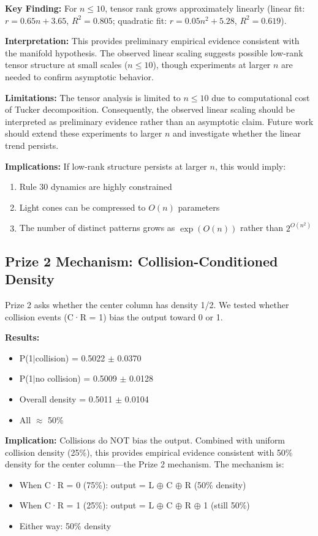 \documentclass[11pt]{article}
\begin{document}
\textbf{Key Finding:} For $n \leq 10$, tensor rank grows approximately linearly (linear fit: $r = 0.65n + 3.65$, $R^2 = 0.805$; quadratic fit: $r = 0.05n^2 + 5.28$, $R^2 = 0.619$).

\textbf{Interpretation:} This provides preliminary empirical evidence consistent with the manifold hypothesis. The observed linear scaling suggests possible low-rank tensor structure at small scales ($n \leq 10$), though experiments at larger $n$ are needed to confirm asymptotic behavior.

\textbf{Limitations:} The tensor analysis is limited to $n \leq 10$ due to computational cost of Tucker decomposition. Consequently, the observed linear scaling should be interpreted as preliminary evidence rather than an asymptotic claim. Future work should extend these experiments to larger $n$ and investigate whether the linear trend persists.

\textbf{Implications:} If low-rank structure persists at larger $n$, this would imply:
\begin{enumerate}
    \item Rule 30 dynamics are highly constrained
    \item Light cones can be compressed to $O(n)$ parameters
    \item The number of distinct patterns grows as $\exp(O(n))$ rather than $2^{O(n^2)}$
\end{enumerate}

\subsection{Prize 2 Mechanism: Collision-Conditioned Density}

Prize 2 asks whether the center column has density 1/2. We tested whether 
collision events (C·R = 1) bias the output toward 0 or 1.

\textbf{Results:} 
\begin{itemize}
    \item P(1$|$collision) = 0.5022 $\pm$ 0.0370
    \item P(1$|$no collision) = 0.5009 $\pm$ 0.0128
    \item Overall density = 0.5011 $\pm$ 0.0104
    \item All $\approx$ 50\%
\end{itemize}

\textbf{Implication:} Collisions do NOT bias the output. Combined with
uniform collision density (25\%), this provides empirical evidence consistent 
with 50\% density for the center column---the Prize 2 mechanism. The mechanism is:
\begin{itemize}
    \item When C·R = 0 (75\%): output = L $\oplus$ C $\oplus$ R (50\% density)
    \item When C·R = 1 (25\%): output = L $\oplus$ C $\oplus$ R $\oplus$ 1 (still 50\%)
    \item Either way: 50\% density
\end{itemize}
\end{document}

